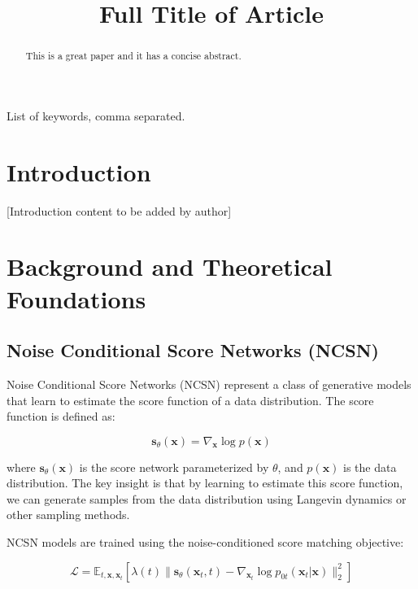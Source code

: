 \documentclass{midl} %
\title[Short Title]{Full Title of Article}
\begin{document}
\maketitle

\begin{abstract}
This is a great paper and it has a concise abstract.
\end{abstract}

\begin{keywords}
List of keywords, comma separated.
\end{keywords}

\section{Introduction}

[Introduction content to be added by author]

\section{Background and Theoretical Foundations}

\subsection{Noise Conditional Score Networks (NCSN)}

Noise Conditional Score Networks (NCSN) represent a class of generative models that learn to estimate the score function of a data distribution. The score function is defined as:

\begin{equation}
\mathbf{s}_\theta(\mathbf{x}) = \nabla_{\mathbf{x}} \log p(\mathbf{x})
\end{equation}

where $\mathbf{s}_\theta(\mathbf{x})$ is the score network parameterized by $\theta$, and $p(\mathbf{x})$ is the data distribution. The key insight is that by learning to estimate this score function, we can generate samples from the data distribution using Langevin dynamics or other sampling methods.

NCSN models are trained using the noise-conditioned score matching objective:

\begin{equation}
\mathcal{L} = \mathbb{E}_{t,\mathbf{x},\mathbf{x}_t} \left[ \lambda(t) \|\mathbf{s}_\theta(\mathbf{x}_t, t) - \nabla_{\mathbf{x}_t} \log p_{0t}(\mathbf{x}_t|\mathbf{x})\|_2^2 \right]
\end{equation}
\end{document}
